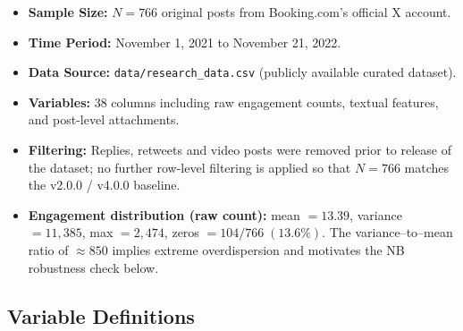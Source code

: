 \documentclass[12pt,a4paper]{article}
\begin{document}
\begin{itemize}
    \item \textbf{Sample Size:} $N = 766$ original posts from Booking.com's official X account.
    \item \textbf{Time Period:} November 1, 2021 to November 21, 2022.
    \item \textbf{Data Source:} \texttt{data/research\_data.csv} (publicly available curated dataset).
    \item \textbf{Variables:} 38 columns including raw engagement counts, textual features, and post-level attachments.
    \item \textbf{Filtering:} Replies, retweets and video posts were removed prior to release of the dataset; no further row-level filtering is applied so that $N=766$ matches the v2.0.0 / v4.0.0 baseline.
    \item \textbf{Engagement distribution (raw count):} mean $=13.39$, variance $=11{,}385$, max $=2{,}474$, zeros $=104/766\;(13.6\%)$. The variance--to--mean ratio of $\approx 850$ implies extreme overdispersion and motivates the NB robustness check below.
\end{itemize}

\subsection{Variable Definitions}
\end{document}
